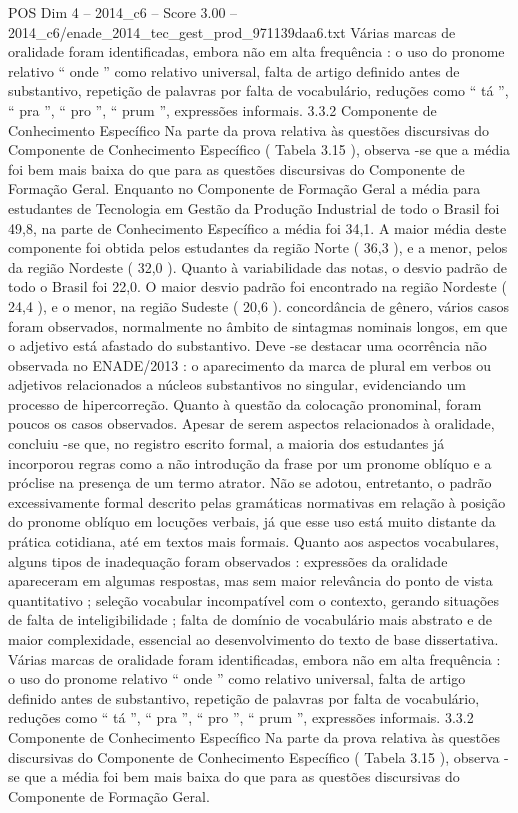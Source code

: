 \begin{textsample}{POS Dim 4 – 2014\_c6 – Score 3.00 – 2014\_c6/enade\_2014\_tec\_gest\_prod\_971139daa6.txt}
Várias marcas de oralidade foram identificadas, embora não em alta frequência : o uso do pronome relativo “ onde ” como relativo universal, falta de artigo definido antes de substantivo, repetição de palavras por falta de vocabulário, reduções como “ tá ”, “ pra ”, “ pro ”, “ prum ”, expressões informais. 3.3.2 Componente de Conhecimento Específico Na parte da prova relativa às questões discursivas do Componente de Conhecimento Específico ( Tabela 3.15 ), observa -se que a média foi bem mais baixa do que para as questões discursivas do Componente de Formação Geral.
Enquanto no Componente de Formação Geral a média para estudantes de Tecnologia em Gestão da Produção Industrial de todo o Brasil foi 49,8, na parte de Conhecimento Específico a média foi 34,1.
A maior média deste componente foi obtida pelos estudantes da região Norte ( 36,3 ), e a menor, pelos da região Nordeste ( 32,0 ).
Quanto à variabilidade das notas, o desvio padrão de todo o Brasil foi 22,0.
O maior desvio padrão foi encontrado na região Nordeste ( 24,4 ), e o menor, na região Sudeste ( 20,6 ). concordância de gênero, vários casos foram observados, normalmente no âmbito de sintagmas nominais longos, em que o adjetivo está afastado do substantivo.
Deve -se destacar uma ocorrência não observada no ENADE/2013 : o aparecimento da marca de plural em verbos ou adjetivos relacionados a núcleos substantivos no singular, evidenciando um processo de hipercorreção.
Quanto à questão da colocação pronominal, foram poucos os casos observados.
Apesar de serem aspectos relacionados à oralidade, concluiu -se que, no registro escrito formal, a maioria dos estudantes já incorporou regras como a não introdução da frase por um pronome oblíquo e a próclise na presença de um termo atrator.
Não se adotou, entretanto, o padrão excessivamente formal descrito pelas gramáticas normativas em relação à posição do pronome oblíquo em locuções verbais, já que esse uso está muito distante da prática cotidiana, até em textos mais formais.
Quanto aos aspectos vocabulares, alguns tipos de inadequação foram observados : expressões da oralidade apareceram em algumas respostas, mas sem maior relevância do ponto de vista quantitativo ; seleção vocabular incompatível com o contexto, gerando situações de falta de inteligibilidade ; falta de domínio de vocabulário mais abstrato e de maior complexidade, essencial ao desenvolvimento do texto de base dissertativa.
Várias marcas de oralidade foram identificadas, embora não em alta frequência : o uso do pronome relativo “ onde ” como relativo universal, falta de artigo definido antes de substantivo, repetição de palavras por falta de vocabulário, reduções como “ tá ”, “ pra ”, “ pro ”, “ prum ”, expressões informais. 3.3.2 Componente de Conhecimento Específico Na parte da prova relativa às questões discursivas do Componente de Conhecimento Específico ( Tabela 3.15 ), observa -se que a média foi bem mais baixa do que para as questões discursivas do Componente de Formação Geral.

\end{textsample}
